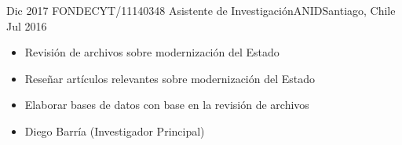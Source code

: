 \begin{experiences}
  \emptySeparator 
  \experience 
    {Dic 2017} {FONDECYT/11140348 Asistente de Investigación}{ANID}{Santiago, Chile} {Jul 2016}
    {\begin{itemize}
    \item Revisión de archivos sobre modernización del Estado
    \item Reseñar artículos relevantes sobre modernización del Estado
    \item Elaborar bases de datos con base en la revisión de archivos
    \item Diego Barría {\small (Investigador Principal)}
    \end{itemize}}
    {}
\end{experiences}
\vspace{-2mm}

